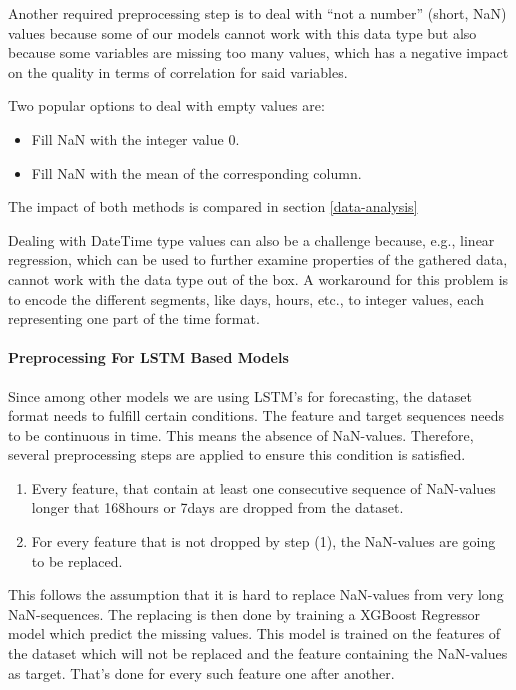 \documentclass[a4paper]{article}
\providecommand{\tightlist}{%
      \setlength{\itemsep}{0pt}\setlength{\parskip}{0pt}}
\begin{document}
Another required preprocessing step is to deal with ``not a number''
(short, NaN) values because some of our models cannot work with this
data type but also because some variables are missing too many values,
which has a negative impact on the quality in terms of correlation for
said variables.

Two popular options to deal with empty values are:

    \begin{itemize}
\tightlist
\item
  Fill NaN with the integer value 0.
\item
  Fill NaN with the mean of the corresponding column.
\end{itemize}

The impact of both methods is compared in section \ref{data-analysis}~

Dealing with DateTime type values can also be a challenge because, e.g.,
linear regression, which can be used to further examine properties of
the gathered data, cannot work with the data type out of the box. A
workaround for this problem is to encode the different segments, like
days, hours, etc., to integer values, each representing one part of the
time format.

    \paragraph{Preprocessing For LSTM Based
Models}\label{preprocessing-for-lstm-based-models}

    Since among other models we are using LSTM's for forecasting, the
dataset format needs to fulfill certain conditions. The feature and
target sequences needs to be continuous in time. This means the absence
of NaN-values. Therefore, several preprocessing steps are applied to
ensure this condition is satisfied.

\begin{enumerate}
\def\labelenumi{\arabic{enumi}.}
\tightlist
\item
  Every feature, that contain at least one consecutive sequence of
  NaN-values longer that 168hours or 7days are dropped from the dataset.
\item
  For every feature that is not dropped by step (1), the NaN-values are
  going to be replaced.
\end{enumerate}

This follows the assumption that it is hard to replace NaN-values from
very long NaN-sequences. The replacing is then done by training a
XGBoost Regressor model which predict the missing values. This model is
trained on the features of the dataset which will not be replaced and
the feature containing the NaN-values as target. That's done for every
such feature one after another.
\end{document}
